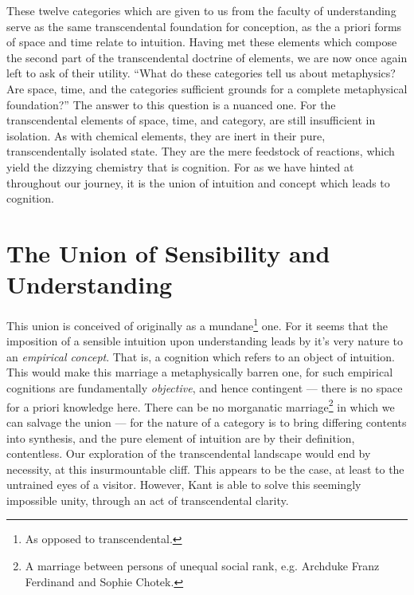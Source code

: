 

\noindent
These twelve categories which are given to us from the faculty of understanding serve as the same transcendental foundation for conception, as the a priori forms of space and time relate to intuition. Having met these elements which compose the second part of the transcendental doctrine of elements, we are now once again left to ask of their utility. \enquote{What do these categories tell us about metaphysics? Are space, time, and the categories sufficient grounds for a complete metaphysical foundation?} The answer to this question is a nuanced one. For the transcendental elements of space, time, and category, are still insufficient in isolation. As with chemical elements, they are inert in their pure, transcendentally isolated state. They are the mere feedstock of reactions, which yield the dizzying chemistry that is cognition. For as we have hinted at throughout our journey, it is the union of intuition and concept which leads to cognition.

\clearpage

\section{The Union of Sensibility and Understanding}

This union is conceived of originally as a mundane\footnote{As opposed to transcendental.} one. For it seems that the imposition of a sensible intuition upon understanding leads by it's very nature to an \emph{empirical concept}. That is, a cognition which refers to an object of intuition. This would make this marriage a metaphysically barren one, for such empirical cognitions are fundamentally \emph{objective}, and hence contingent --- there is no space for a priori knowledge here. There can be no morganatic marriage\footnote{A marriage between persons of unequal social rank, e.g. Archduke Franz Ferdinand and Sophie Chotek.} in which we can salvage the union --- for the nature of a category is to bring differing contents into synthesis, and the pure element of intuition are by their definition, contentless. Our exploration of the transcendental landscape would end by necessity, at this insurmountable cliff. This appears to be the case, at least to the untrained eyes of a visitor. However, Kant is able to solve this seemingly impossible unity, through an act of transcendental clarity.


